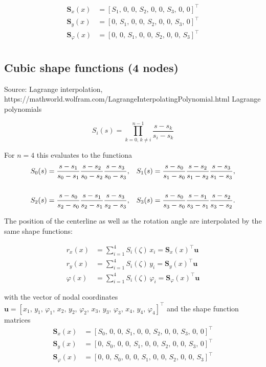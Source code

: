 \begin{align}
\boldsymbol{S}_{x}(x) &= \left[S_1,\,0,\,0,\,S_2,\,0,\,0,\,S_3,\,0,\,0\right]^\intercal \\
\boldsymbol{S}_{y}(x) &= \left[0,\,S_1,\,0,\,0,\,S_2,\,0,\,0,\,S_3,\,0\right]^\intercal \\
\boldsymbol{S}_{\varphi}(x) &= \left[0,\,0,\,S_1,\,0,\,0,\,S_2,\,0,\,0,\,S_3\right]^\intercal \\
\end{align}


\subsection{Cubic shape functions (4 nodes)}

Source: Lagrange interpolation, https://mathworld.wolfram.com/LagrangeInterpolatingPolynomial.html
Lagrange polynomials

\begin{equation}
S_{i}(s) = \prod_{k=0,\,k\neq i}^{n-1} \frac{s - s_k}{s_i - s_k}
\end{equation}

For $n=4$ this evaluates to the functiona
%
\begin{align}
S_0(s) &= \frac{s - s_1}{s_0 - s_1}\frac{s - s_2}{s_0 - s_2}\frac{s - s_3}{s_0 - s_3}, & S_1(s) &= \frac{s - s_0}{s_1 - s_0}\frac{s - s_2}{s_1 - s_2}\frac{s - s_3}{s_1 - s_3}, \notag \\
\notag \\
S_2(s) &= \frac{s - s_0}{s_2 - s_0}\frac{s - s_1}{s_2 - s_1}\frac{s - s_3}{s_2 - s_3}, & S_3(s) &= \frac{s - s_0}{s_3 - s_0}\frac{s - s_1}{s_3 - s_1}\frac{s - s_2}{s_3 - s_2}.
\end{align}

The position of the centerline as well as the rotation angle are interpolated by the same shape functions:

\begin{align}
r_x(x) &= \sum_{i=1}^4 S_{i}(\zeta)\,x_i = \boldsymbol{S}_{x}(x)^\intercal\boldsymbol{u} \\
r_y(x) &= \sum_{i=1}^4 S_{i}(\zeta)\,y_i = \boldsymbol{S}_{y}(x)^\intercal\boldsymbol{u} \\
\varphi(x) &= \sum_{i=1}^4 S_{i}(\zeta)\,\varphi_i = \boldsymbol{S}_{\varphi}(x)^\intercal\boldsymbol{u}
\end{align}

with the vector of nodal coordinates $\boldsymbol{u} = \left[x_1,\,y_1,\,\varphi_1,\,x_2,\,y_2,\,\varphi_2,\,x_3,\,y_3,\,\varphi_3,\,x_4,\,y_4,\,\varphi_4\right]^\intercal$ and the shape function matrices
%
\begin{align}
\boldsymbol{S}_{x}(x) &= \left[S_0,\,0,\,0,\,S_1,\,0,\,0,\,S_2,\,0,\,0,\,S_3,\,0,\,0\right]^\intercal \\
\boldsymbol{S}_{y}(x) &= \left[0,\,S_0,\,0,\,0,\,S_1,\,0,\,0,\,S_2,\,0,\,0,\,S_3,\,0\right]^\intercal \\
\boldsymbol{S}_{\varphi}(x) &= \left[0,\,0,\,S_0,\,0,\,0,\,S_1,\,0,\,0,\,S_2,\,0,\,0,\,S_3\right]^\intercal
\end{align}

